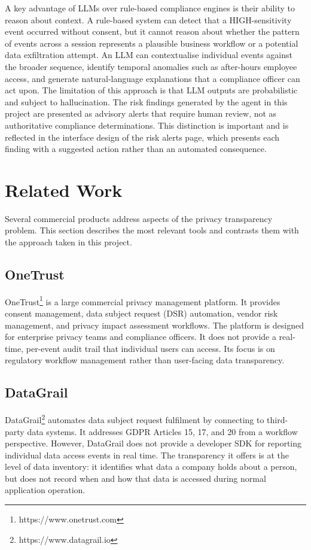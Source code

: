 \documentclass[a4paper,12pt,onecolumn]{report}
\begin{document}
A key advantage of LLMs over rule-based compliance engines is their ability to reason about context.
A rule-based system can detect that a HIGH-sensitivity event occurred without consent, but it cannot reason about whether the pattern of events across a session represents a plausible business workflow or a potential data exfiltration attempt.
An LLM can contextualise individual events against the broader sequence, identify temporal anomalies such as after-hours employee access, and generate natural-language explanations that a compliance officer can act upon.
The limitation of this approach is that LLM outputs are probabilistic and subject to hallucination.
The risk findings generated by the agent in this project are presented as advisory alerts that require human review, not as authoritative compliance determinations.
This distinction is important and is reflected in the interface design of the risk alerts page, which presents each finding with a suggested action rather than an automated consequence.

\section{Related Work}

Several commercial products address aspects of the privacy transparency problem.
This section describes the most relevant tools and contrasts them with the approach taken in this project.

\subsection{OneTrust}

OneTrust\footnote{\label{onetrust}https://www.onetrust.com} is a large commercial privacy management platform.
It provides consent management, data subject request (DSR) automation, vendor risk management, and privacy impact assessment workflows.
The platform is designed for enterprise privacy teams and compliance officers.
It does not provide a real-time, per-event audit trail that individual users can access.
Its focus is on regulatory workflow management rather than user-facing data transparency.

\subsection{DataGrail}

DataGrail\footnote{\label{datagrail}https://www.datagrail.io} automates data subject request fulfilment by connecting to third-party data systems.
It addresses GDPR Articles 15, 17, and 20 from a workflow perspective.
However, DataGrail does not provide a developer SDK for reporting individual data access events in real time.
The transparency it offers is at the level of data inventory: it identifies what data a company holds about a person, but does not record when and how that data is accessed during normal application operation.
\end{document}
